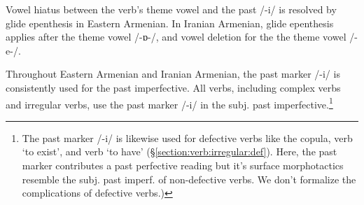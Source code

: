 Vowel hiatus between the verb's theme vowel and the past /{-i}/ is resolved by glide epenthesis in Eastern Armenian. In Iranian Armenian, glide epenthesis applies after the theme vowel /{-ɒ-}/, and vowel deletion for the the theme vowel /{-e-}/.

Throughout Eastern Armenian and Iranian Armenian, the past marker /{-i}/ is consistently used for the past imperfective. All verbs, including complex verbs  and irregular verbs, use the past marker /{-i}/ in the subj. past imperfective.\footnote{The past marker /{-i}/ is likewise used for defective verbs like the copula, verb `to exist', and verb `to have' (\S\ref{section:verb:irregular:def}). Here, the past marker contributes a past perfective reading but it's surface morphotactics resemble the subj. past imperf. of non-defective verbs. We don't formalize the complications of defective verbs.)} 


